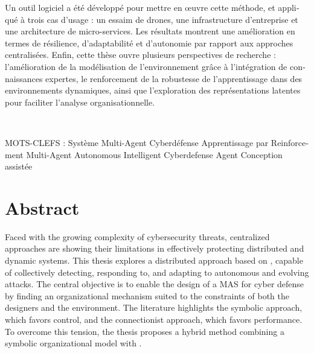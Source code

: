 \begin{otherlanguage}{ngerman}
    Un outil logiciel a été développé pour mettre en œuvre cette méthode, et appliqué à trois cas d'usage : un essaim de drones, une infrastructure d'entreprise et une architecture de micro-services. Les résultats montrent une amélioration en termes de résilience, d'adaptabilité et d'autonomie par rapport aux approches centralisées.
    Enfin, cette thèse ouvre plusieurs perspectives de recherche : l'amélioration de la modélisation de l'environnement grâce à l'intégration de connaissances expertes, le renforcement de la robustesse de l'apprentissage dans des environnements dynamiques, ainsi que l'exploration des représentations latentes pour faciliter l'analyse organisationnelle.

    \medskip

    \

    \noindent MOTS-CLEFS :
    Système Multi-Agent \raisebox{0.25ex}{\tiny$\bullet$} Cyberdéfense \raisebox{0.25ex}{\tiny$\bullet$} Apprentissage par Reinforcement Multi-Agent \raisebox{0.25ex}{\tiny$\bullet$} Autonomous Intelligent Cyberdefense Agent \raisebox{0.25ex}{\tiny$\bullet$} Conception assistée

\end{otherlanguage}

\clearpage
\thispagestyle{empty}
\null
\newpage

\chapter*{Abstract}

Faced with the growing complexity of cybersecurity threats, centralized approaches are showing their limitations in effectively protecting distributed and dynamic systems. This thesis explores a distributed approach based on , capable of collectively detecting, responding to, and adapting to autonomous and evolving attacks.
%
The central objective is to enable the design of a MAS for cyber defense by finding an organizational mechanism suited to the constraints of both the designers and the environment. The literature highlights the symbolic approach, which favors control, and the connectionist approach, which favors performance. To overcome this tension, the thesis proposes a hybrid method combining a symbolic organizational model with .

